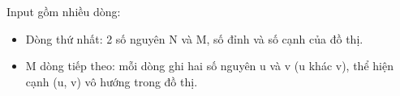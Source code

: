 Input gồm nhiều dòng:
\begin{itemize}
	\item Dòng thứ nhất: 2 số nguyên N và M, số đỉnh và số cạnh của đồ thị. 
	\item M dòng tiếp theo: mỗi dòng ghi hai số nguyên u và v (u khác v), thể hiện cạnh (u, v) vô hướng trong đồ thị.
\end{itemize}